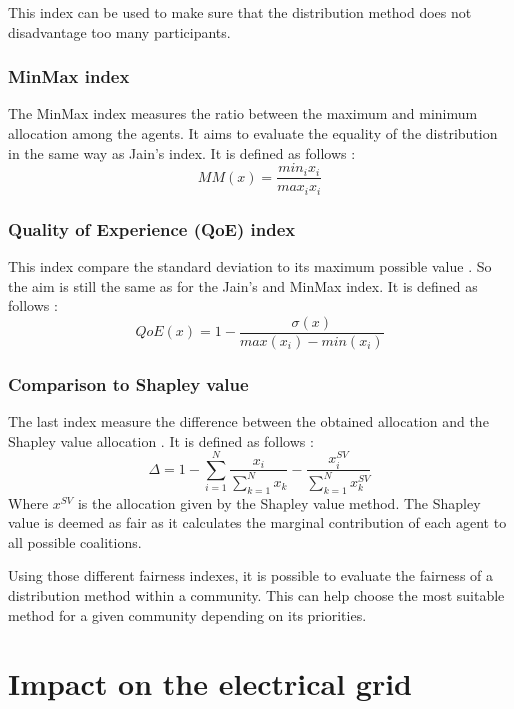 \documentclass[12pt,a4paper]{article}
\begin{document}
This index can be used to make sure that the distribution method does not disadvantage too many participants.
\subsubsection{MinMax index}
The MinMax index \cite{these_new} measures the ratio between the maximum and minimum allocation among the agents. It aims to evaluate the equality of the distribution in the same way as Jain's index. It is defined as follows :
\begin{equation}
    MM(x) = \frac{min_i{x_i}}{max_i{x_i}} \nonumber
\end{equation}

\subsubsection{Quality of Experience (QoE) index}
This index compare the standard deviation to its maximum possible value \cite{these_new}. So the aim is still the same as for the Jain's and MinMax index. It is defined as follows :
\begin{equation}
    QoE(x) = 1 - \frac{\sigma(x)}{max(x_i) - min(x_i)} \nonumber
\end{equation}

\subsubsection{Comparison to Shapley value}
The last index measure the difference between the obtained allocation and the Shapley value allocation \cite{article_1, these_new, article_8, article_2}. It is defined as follows :
\begin{equation}
    \Delta = 1 - \sum_{i=1}^{N}{\frac{x_i}{\sum_{k=1}^{N}x_k} - \frac{x_i^{SV}}{\sum_{k=1}^{N}{x_k^{SV}}}} \nonumber
\end{equation}
Where $x^{SV}$ is the allocation given by the Shapley value method. The Shapley value is deemed as fair as it calculates the marginal contribution of each agent to all possible coalitions.

Using those different fairness indexes, it is possible to evaluate the fairness of a distribution method within a community. This can help choose the most suitable method for a given community depending on its priorities.



\section{Impact on the electrical grid}
\end{document}
